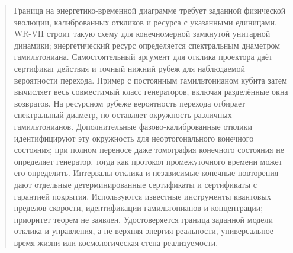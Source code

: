 \maketitle
\begin{abstract}
{Граница на энергетико-временной диаграмме требует заданной физической эволюции, калиброванных откликов и ресурса с указанными единицами. WR-VII строит такую схему для конечномерной замкнутой унитарной динамики; энергетический ресурс определяется спектральным диаметром гамильтониана. Самостоятельный аргумент для отклика проектора даёт сертификат действия и точный нижний рубеж для наблюдаемой вероятности перехода. Пример с постоянным гамильтонианом кубита затем вычисляет весь совместимый класс генераторов, включая разделённые окна возвратов. На ресурсном рубеже вероятность перехода отбирает спектральный диаметр, но оставляет окружность различных гамильтонианов. Дополнительные фазово-калиброванные отклики идентифицируют эту окружность для неортогонального конечного состояния; при полном переносе даже томография конечного состояния не определяет генератор, тогда как протокол промежуточного времени может его определить. Интервалы отклика и независимые конечные повторения дают отдельные детерминированные сертификаты и сертификаты с гарантией покрытия. Используются известные инструменты квантовых пределов скорости, идентификации гамильтонианов и концентрации; приоритет теорем не заявлен. Удостоверяется граница заданной модели отклика и управления, а не верхняя энергия реальности, универсальное время жизни или космологическая стена реализуемости.}
\end{abstract}

